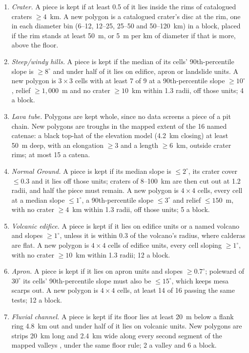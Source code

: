 \documentclass[twocolumn]{aastex701}
\begin{document}
\begin{enumerate}
\item \emph{Crater.} A piece is kept if at least 0.5 of it lies inside the rims of catalogued craters $\ge4$~km. A new
polygon is a catalogued crater's disc at the rim, one in each diameter bin (6--12, 12--25, 25--50 and 50--120~km) in a
block, placed if the rim stands at least 50~m, or 5~m per km of diameter if that is more, above the floor.
\item \emph{Steep/windy hills.} A piece is kept if the median of its cells' 90th-percentile slope is $\ge8^{\circ}$ and
under half of it lies on edifice, apron or landslide units. A new polygon is $3\times3$ cells with at least 7 of 9 at a
90th-percentile slope $\ge10^{\circ}$, relief $\ge1{,}000$~m and no crater $\ge10$~km within 1.3 radii, off those
units; 4 a block.
\item \emph{Lava tube.} Polygons are kept whole, since no data screens a piece of a pit chain. New polygons are
troughs in the mapped extent of the 16 named catenae: a black top-hat of the elevation model (4.2~km closing) at
least 50~m deep, with an elongation $\ge3$ and a length $\ge6$~km, outside crater rims; at most 15 a catena.
\item \emph{Normal Ground.} A piece is kept if its median slope is $\le2^{\circ}$, its crater cover $\le0.3$ and it
lies off those units; craters of 8--100~km are then cut out at 1.2 radii, and half the piece must remain. A new
polygon is $4\times4$ cells, every cell at a median slope $\le1^{\circ}$, a 90th-percentile slope $\le3^{\circ}$ and
relief $\le150$~m, with no crater $\ge4$~km within 1.3 radii, off those units; 5 a block.
\item \emph{Volcanic edifice.} A piece is kept if it lies on edifice units or a named volcano and slopes
$\ge1^{\circ}$, unless it is within 0.3 of the volcano's radius, where calderas are flat. A new polygon is $4\times4$
cells of edifice units, every cell sloping $\ge1^{\circ}$, with no crater $\ge10$~km within 1.3 radii; 12 a block.
\item \emph{Apron.} A piece is kept if it lies on apron units and slopes $\ge0.7^{\circ}$; poleward of $30^{\circ}$ its
cells' 90th-percentile slope must also be $\le15^{\circ}$, which keeps mesa scarps out. A new polygon is $4\times4$
cells, at least 14 of 16 passing the same tests; 12 a block.
\item \emph{Fluvial channel.} A piece is kept if its floor lies at least 20~m below a flank ring 4.8~km out and under
half of it lies on volcanic units. New polygons are strips 20~km long and 2.4~km wide along every second segment of
the mapped valleys \citep{Alemanno2018}, under the same floor rule; 2 a valley and 6 a block.
\end{enumerate}
\end{document}
